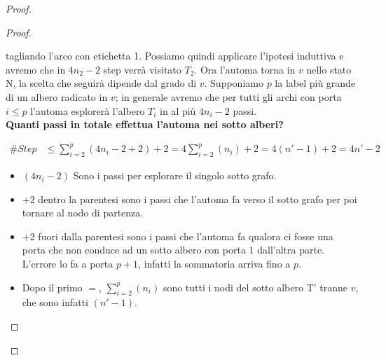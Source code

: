 \begin{proof}
\begin{proof}
\begin{itemize}
\begin{itemize}
                            tagliando l'arco con etichetta 1. Possiamo quindi
                            applicare l'ipotesi induttiva e avremo che in
                            $4n_2-2$ step verrà visitato $T_2$. Ora l'automa
                            torna in $v$ nello stato N, la scelta che seguirà
                            dipende dal grado di $v$. Supponiamo $p$ la label
                            più grande di un albero radicato in $v$; in generale
                            avremo che per tutti gli archi con porta $i \leq p$
                            l'automa esplorerà l'albero $T_i$ in al più $4n_i -
                                2$ passi.\\
                            \textbf{Quanti passi in totale effettua
                                l'automa nei sotto alberi?}
                  \end{itemize}
        \end{itemize}
        \begin{equation}\nonumber
            \begin{split}
                \#Step & \leq \sum_{i=2}^{p} (4 n_i - 2 +2) +2= 4\sum_{i=2}^{p} (n_i)+2  = 4(n'-1)+2 = 4n'-2
            \end{split}
        \end{equation}

        \begin{itemize}
            \item $(4 n_i - 2)$ Sono i passi per esplorare il singolo sotto
                  grafo.
            \item +2 dentro la parentesi sono i passi che l'automa fa verso il
                  sotto grafo per poi tornare al nodo di partenza.
            \item +2 fuori dalla parentesi sono i passi che l'automa fa qualora
                  ci fosse una porta che non conduce ad un sotto albero con
                  porta 1 dall'altra parte. L'errore lo fa a porta $p+1$,
                  infatti la sommatoria arriva fino a $p$.
            \item Dopo il primo $=$, $\sum_{i=2}^{p} (n_i)$ sono tutti i nodi
                  del sotto albero T' tranne $v$, che sono infatti $(n'-1)$.
        \end{itemize}



\end{proof}
\end{proof}
